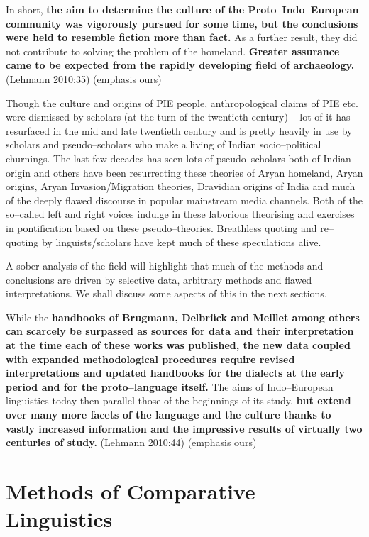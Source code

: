 \begin{myquote}
In short, \textbf{the aim to determine the culture of the Proto–Indo–European community was vigorously pursued for some time, but the conclusions were held to resemble fiction more than fact.} As a further result, they did not contribute to solving the problem of the homeland. \textbf{Greater assurance came to be expected from the rapidly developing field of archaeology.} (Lehmann 2010:35) (emphasis ours)
\end{myquote}

Though the culture and origins of PIE people, anthropological claims of PIE etc. were dismissed by scholars (at the turn of the twentieth century) – lot of it has resurfaced in the mid and late twentieth century and is pretty heavily in use by scholars and pseudo–scholars who make a living of Indian socio–political churnings. The last few decades has seen lots of pseudo–scholars both of Indian origin and others have been resurrecting these theories of Aryan homeland, Aryan origins, Aryan Invasion/Migration theories, Dravidian origins of India and much of the deeply flawed discourse in popular mainstream media channels. Both of the so–called left and right voices indulge in these laborious theorising and exercises in pontification based on these pseudo–theories. Breathless quoting and re–quoting by linguists/scholars have kept much of these speculations alive.

A sober analysis of the field will highlight that much of the methods and conclusions are driven by selective data, arbitrary methods and flawed interpretations. We shall discuss some aspects of this in the next sections.

\begin{myquote}
While the \textbf{handbooks of Brugmann, Delbrück and Meillet among others can scarcely be surpassed as sources for data and their interpretation at the time each of these works was published, the new data coupled with expanded methodological procedures require revised interpretations and updated handbooks for the dialects at the early period and for the proto–language itself.} The aims of Indo–European linguistics today then parallel those of the beginnings of its study, \textbf{but extend over many more facets of the language and the culture thanks to vastly increased information and the impressive results of virtually two centuries of study.} (Lehmann 2010:44) (emphasis ours)
\end{myquote}


\section*{Methods of Comparative Linguistics}

